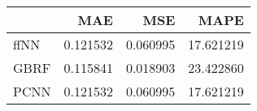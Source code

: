 \begin{tabular}{lrrr}
\toprule
{} &       MAE &       MSE &       MAPE \\
\midrule
ffNN &  0.121532 &  0.060995 &  17.621219 \\
GBRF &  0.115841 &  0.018903 &  23.422860 \\
PCNN &  0.121532 &  0.060995 &  17.621219 \\
\bottomrule
\end{tabular}

